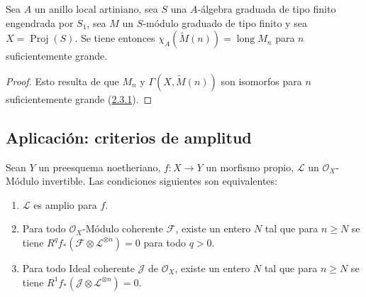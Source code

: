 \begin{corollary}[2.5.4]
\label{III.2.5.4}
\label{III.2.5.4-fr}
Sea $A$ un anillo local artiniano, sea $S$ una $A$-álgebra graduada de tipo finito engendrada por $S_1$, sea $M$ un $S$-módulo graduado de tipo finito y sea
$X=\operatorname{Proj}(S)$. Se tiene entonces
$\chi_A(\widetilde M(n))=\operatorname{long}M_n$
para $n$ suficientemente grande.
\end{corollary}

\begin{proof}
Esto resulta de que $M_n$ y $\Gamma(X,\widetilde M(n))$ son
isomorfos para $n$ suficientemente grande
(\hyperref[III.2.3.1-fr]{2.3.1}).
\end{proof}

\subsection{Aplicación: criterios de amplitud}
\label{subsection:III.2.6-fr}

\begin{proposition}[2.6.1]
\label{III.2.6.1-fr}
Sean $Y$ un preesquema noetheriano, $f:X\to Y$ un morfismo propio,
$\mathcal L$ un $\mathcal O_X$-Módulo invertible. Las condiciones
siguientes son equivalentes:
\begin{enumerate}
\item[\textup{a)}] $\mathcal L$ es amplio para $f$.
\item[\textup{b)}] Para todo $\mathcal O_X$-Módulo coherente $\mathcal F$,
existe un entero $N$ tal que para $n\geq N$ se tiene
$R^qf_*(\mathcal F\otimes\mathcal L^{\otimes n})=0$
para todo $q>0$.
\item[\textup{c)}] Para todo Ideal coherente $\mathcal J$ de $\mathcal O_X$,
existe un entero $N$ tal que para $n\geq N$ se tiene
$R^1f_*(\mathcal J\otimes\mathcal L^{\otimes n})=0$.
\end{enumerate}
\end{proposition}

